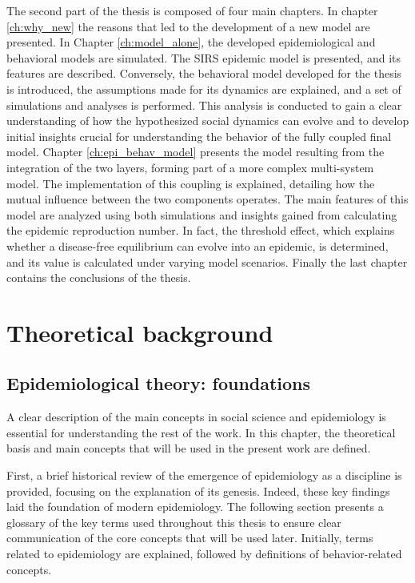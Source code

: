 The second part of the thesis is composed of four main chapters. In chapter \ref{ch:why_new} the reasons that led to the development of a new model are presented.
In Chapter \ref{ch:model_alone}, the developed epidemiological and behavioral models are simulated. The SIRS epidemic model is presented, and its features are described. Conversely, the behavioral model developed for the thesis is introduced, the assumptions made for its dynamics are explained, and a set of simulations and analyses is performed. This analysis is conducted to gain a clear understanding of how the hypothesized social dynamics can evolve and to develop initial insights crucial for understanding the behavior of the fully coupled final model.
Chapter \ref{ch:epi_behav_model} presents the model resulting from the integration of the two layers, forming part of a more complex multi-system model. The implementation of this coupling is explained, detailing how the mutual influence between the two components operates. The main features of this model are analyzed using both simulations and insights gained from calculating the epidemic reproduction number. In fact, the threshold effect, which explains whether a disease-free equilibrium can evolve into an epidemic, is determined, and its value is calculated under varying model scenarios.
Finally the last chapter contains the conclusions of the thesis. 
\chapter{Theoretical background}
\label{ch:theo_back}
\section{Epidemiological theory: foundations}

A clear description of the main concepts in social science and epidemiology is essential for understanding the rest of the work. In this chapter, the theoretical basis and main concepts that will be used in the present work are defined. 

First, a brief historical review of the emergence of epidemiology as a discipline is provided, focusing on the explanation of its genesis. Indeed, these key findings laid the foundation of modern  epidemiology. 
The following section presents a glossary of the key terms used throughout this thesis to ensure clear communication of the core concepts that will be used later. Initially, terms related to epidemiology are explained, followed by definitions of behavior-related concepts.

